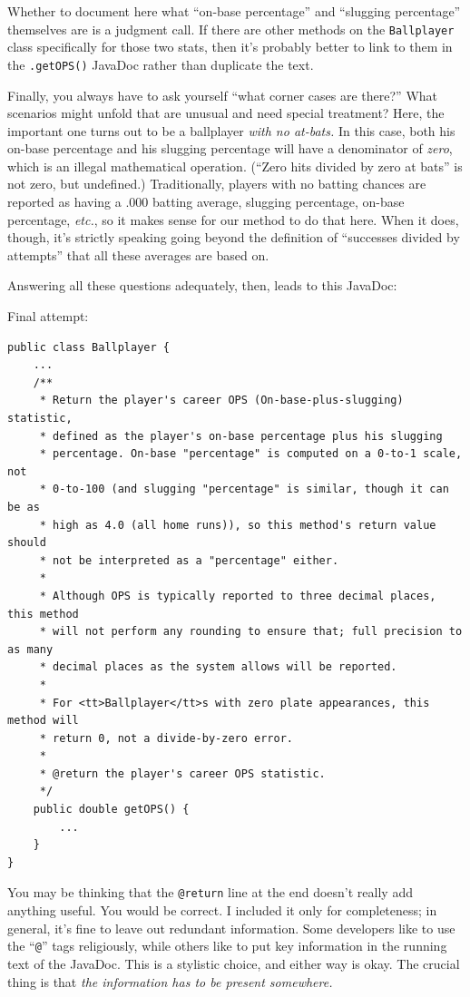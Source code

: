 Whether to document here what ``on-base percentage'' and ``slugging percentage''
themselves are is a judgment call. If there are other methods on the
\texttt{Ballplayer} class specifically for those two stats, then it's probably
better to link to them in the \texttt{.getOPS()} JavaDoc rather than duplicate
the text.

\label{corner case}
Finally, you always have to ask yourself ``what corner cases are there?'' What
scenarios might unfold that are unusual and need special treatment? Here, the
important one turns out to be a ballplayer \textit{with no at-bats.} In this
case, both his on-base percentage and his slugging percentage will have a
denominator of \textit{zero}, which is an illegal mathematical operation.
(``Zero hits divided by zero at bats'' is not zero, but undefined.)
Traditionally, players with no batting chances are reported as having a .000
batting average, slugging percentage, on-base percentage, \textit{etc.}, so it
makes sense for our method to do that here. When it does, though, it's
strictly speaking going beyond the definition of ``successes divided by
attempts'' that all these averages are based on.

Answering all these questions adequately, then, leads to this JavaDoc:

\pagebreak
Final attempt:
\vspace{-.15in}
\begin{Verbatim}[fontsize=\footnotesize,samepage=true,frame=single]
public class Ballplayer {
    ...
    /**
     * Return the player's career OPS (On-base-plus-slugging) statistic,
     * defined as the player's on-base percentage plus his slugging 
     * percentage. On-base "percentage" is computed on a 0-to-1 scale, not
     * 0-to-100 (and slugging "percentage" is similar, though it can be as
     * high as 4.0 (all home runs)), so this method's return value should
     * not be interpreted as a "percentage" either.
     * 
     * Although OPS is typically reported to three decimal places, this method
     * will not perform any rounding to ensure that; full precision to as many
     * decimal places as the system allows will be reported.
     *
     * For <tt>Ballplayer</tt>s with zero plate appearances, this method will
     * return 0, not a divide-by-zero error.
     *
     * @return the player's career OPS statistic.
     */
    public double getOPS() {
        ...
    }
}
\end{Verbatim}

You may be thinking that the \texttt{@return} line at the end doesn't really
add anything useful. You would be correct. I included it only for
completeness; in general, it's fine to leave out redundant information. Some
developers like to use the ``\texttt{@}'' tags religiously, while others like
to put key information in the running text of the JavaDoc. This is a stylistic
choice, and either way is okay. The crucial thing is that \textit{the
information has to be present somewhere.}

